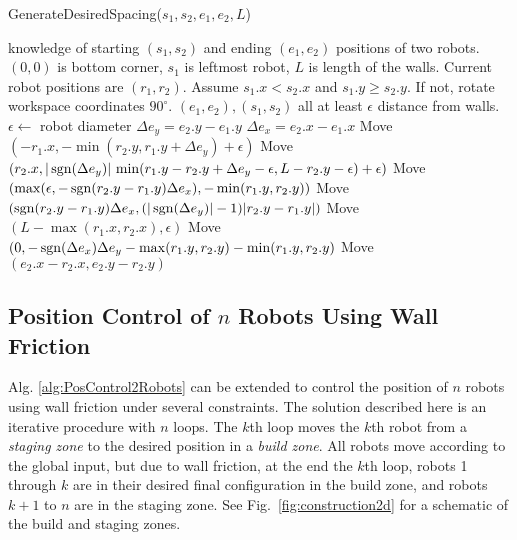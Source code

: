 \begin{algorithm}
\caption{GenerateDesiredSpacing($s_1,s_2,e_1,e_2,L$)}\label{alg:PosControl2Robots}
\begin{algorithmic}[1]
\scriptsize
\Require knowledge of starting $(s_1,s_2)$ and ending $(e_1,e_2)$ positions of  two robots. 
$(0,0)$ is bottom corner, $s_1$ is leftmost robot, 
 $L$ is length of the walls. Current robot positions are $(r_1,r_2)$.
 Assume $s_1.x < s_2.x$ and $s_1.y \geq s_2.y$. If not, rotate workspace coordinates $90^{\circ}$.
\Ensure $(e_1, e_2) , (s_1, s_2)$ all at least $\epsilon$ distance from walls.
\State $\epsilon \gets$ robot diameter
\State $\Delta e_y = e_2.y - e_1.y$
\State $\Delta e_x = e_2.x - e_1.x$
\State Move $\left(-r_1.x , -\min \left(r_2.y , r_1.y+ \Delta e_y \right)+\epsilon \right)$ 
\State Move $ (r_2.x, |\operatorname{sgn}(\Delta e_y)| \, \min(r_1.y - r_2.y + \Delta e_y-\epsilon,L-r_2.y-\epsilon)+ \epsilon)$
\Statex {}
\State Move $(\max(\epsilon, -\operatorname{sgn}(r_2.y - r_1.y)\Delta e_x), -\min(r_1.y , r_2.y))$ 
\Statex {}
\State Move $(\operatorname{sgn}(r_2.y - r_1.y)\Delta e_x , (|\operatorname{sgn}(\Delta e_y)|-1) |r_2.y - r_1.y|)$ 
\State Move $(L- \max(r_1.x, r_2.x) , \epsilon)$ 
\State Move $(0, -\operatorname{sgn}(\Delta e_x)\Delta e_y -\max(r_1.y, r_2.y)- \min(r_1.y, r_2.y)$ 
\Statex {}
\EndIf
\State Move $(e_2.x - r_2.x, e_2.y - r_2.y)$ 
\end{algorithmic}
\end{algorithm}






\subsection{Position Control of $n$ Robots Using Wall Friction}\label{sec:PostionControlnRobots}
Alg. \ref{alg:PosControl2Robots}  can be extended to control the position of $n$ robots using wall friction under several constraints. The solution described here is an iterative procedure with $n$ loops. The $k$th loop moves the $k$th robot from a \emph{staging zone} to the desired position in a \emph{build zone}. All robots move according to the global input, but due to wall friction, at the end the $k$th loop, robots 1 through $k$ are in their desired final configuration in the build zone, and robots $k+1$ to $n$ are in the staging zone. See Fig.~\ref{fig:construction2d} for a schematic of the build and staging zones.


